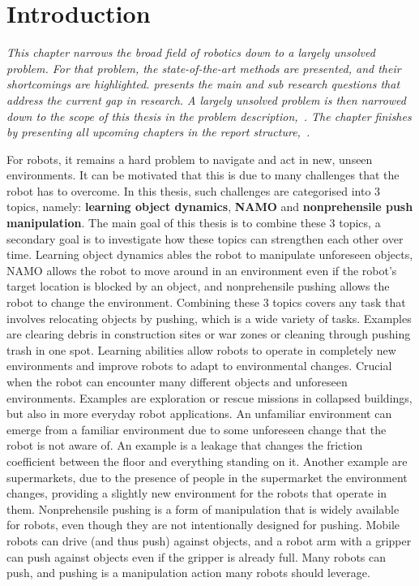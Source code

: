 \chapter{Introduction}%
\label{chap:introduction}
\textit{This chapter narrows the broad field of robotics down to a largely unsolved problem. For that problem, the state-of-the-art methods are presented, and their shortcomings are highlighted.  presents the main and sub research questions that address the current gap in research. A largely unsolved problem is then narrowed down to the scope of this thesis in the problem description,~. The chapter finishes by presenting all upcoming chapters in the report structure,~.\bs}


For robots, it remains a hard problem to navigate and act in new, unseen environments. It can be motivated that this is due to many challenges that the robot has to overcome. In this thesis, such challenges are categorised into 3 topics, namely: \textbf{learning object dynamics}, \textbf{\ac{NAMO}} and \textbf{nonprehensile push manipulation}. The main goal of this thesis is to combine these 3 topics, a secondary goal is to investigate how these topics can strengthen each other over time. Learning object dynamics ables the robot to manipulate unforeseen objects, \ac{NAMO} allows the robot to move around in an environment even if the robot's target location is blocked by an object, and nonprehensile pushing allows the robot to change the environment. Combining these 3 topics covers any task that involves relocating objects by pushing, which is a wide variety of tasks. Examples are clearing debris in construction sites or war zones or cleaning through pushing trash in one spot. Learning abilities allow robots to operate in completely new environments and improve robots to adapt to environmental changes. Crucial when the robot can encounter many different objects and unforeseen environments. Examples are exploration or rescue missions in collapsed buildings, but also in more everyday robot applications. An unfamiliar environment can emerge from a familiar environment due to some unforeseen change that the robot is not aware of. An example is a leakage that changes the friction coefficient between the floor and everything standing on it. Another example are supermarkets, due to the presence of people in the supermarket the environment changes, providing a slightly new environment for the robots that operate in them. Nonprehensile pushing is a form of manipulation that is widely available for robots, even though they are not intentionally designed for pushing. Mobile robots can drive (and thus push) against objects, and a robot arm with a gripper can push against objects even if the gripper is already full. Many robots can push, and pushing is a manipulation action many robots should leverage.\bs

